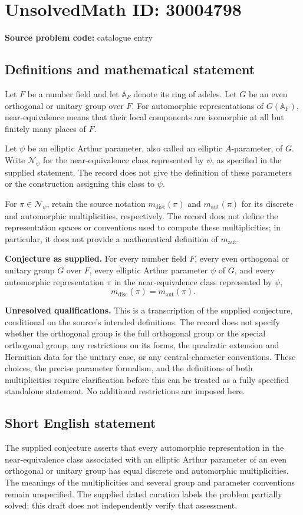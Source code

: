 \documentclass[11pt]{article}
\begin{document}
\section*{UnsolvedMath ID: 30004798}
\textbf{Source problem code:} catalogue entry
\subsection{Definitions and mathematical statement}
Let \(F\) be a number field and let \(\mathbb A_F\) denote its ring of adeles. Let \(G\) be an even orthogonal or unitary group over \(F\). For automorphic representations of \(G(\mathbb A_F)\), near-equivalence means that their local components are isomorphic at all but finitely many places of \(F\).

Let \(\psi\) be an elliptic Arthur parameter, also called an elliptic \(A\)-parameter, of \(G\). Write \(\mathcal N_\psi\) for the near-equivalence class represented by \(\psi\), as specified in the supplied statement. The record does not give the definition of these parameters or the construction assigning this class to \(\psi\).

For \(\pi\in\mathcal N_\psi\), retain the source notation \(m_{\mathrm{disc}}(\pi)\) and \(m_{\mathrm{aut}}(\pi)\) for its discrete and automorphic multiplicities, respectively. The record does not define the representation spaces or conventions used to compute these multiplicities; in particular, it does not provide a mathematical definition of \(m_{\mathrm{aut}}\).

\textbf{Conjecture as supplied.} For every number field \(F\), every even orthogonal or unitary group \(G\) over \(F\), every elliptic Arthur parameter \(\psi\) of \(G\), and every automorphic representation \(\pi\) in the near-equivalence class represented by \(\psi\),
\[
 m_{\mathrm{disc}}(\pi)=m_{\mathrm{aut}}(\pi).
\]

\textbf{Unresolved qualifications.} This is a transcription of the supplied conjecture, conditional on the source's intended definitions. The record does not specify whether the orthogonal group is the full orthogonal group or the special orthogonal group, any restrictions on its forms, the quadratic extension and Hermitian data for the unitary case, or any central-character conventions. These choices, the precise parameter formalism, and the definitions of both multiplicities require clarification before this can be treated as a fully specified standalone statement. No additional restrictions are imposed here.
\subsection{Short English statement}
The supplied conjecture asserts that every automorphic representation in the near-equivalence class associated with an elliptic Arthur parameter of an even orthogonal or unitary group has equal discrete and automorphic multiplicities. The meanings of the multiplicities and several group and parameter conventions remain unspecified. The supplied dated curation labels the problem partially solved; this draft does not independently verify that assessment.
\end{document}
